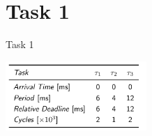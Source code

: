 
\section{Task 1}

\setcounter{task}{1}

\begin{frame}[allowframebreaks]{Task 1}{}
  \begin{tasknoinc}
    \centering
    \includegraphics[width=0.4\textwidth]{./figures/task1_tasks.png}


\end{tasknoinc}
\end{frame}
